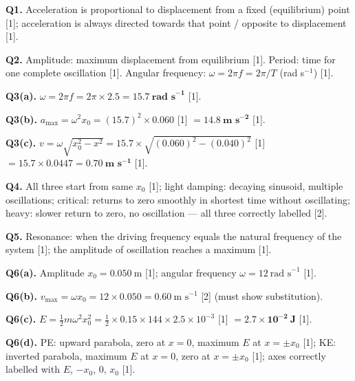 \begin{markscheme}

\textbf{Q1.} Acceleration is proportional to displacement from a fixed (equilibrium) point [1]; acceleration is always directed towards that point / opposite to displacement [1].

\vspace{0.5em}\textbf{Q2.} Amplitude: maximum displacement from equilibrium [1]. Period: time for one complete oscillation [1]. Angular frequency: $\omega = 2\pi f = 2\pi/T$ (rad s$^{-1}$) [1].

\vspace{0.5em}\textbf{Q3(a).} $\omega = 2\pi f = 2\pi \times 2.5 = \mathbf{15.7\ \text{rad s}^{-1}}$ [1].

\vspace{0.5em}\textbf{Q3(b).} $a_{\max} = \omega^2 x_0 = (15.7)^2 \times 0.060$ [1] $= \mathbf{14.8\ \text{m s}^{-2}}$ [1].

\vspace{0.5em}\textbf{Q3(c).} $v = \omega\sqrt{x_0^2 - x^2} = 15.7\times\sqrt{(0.060)^2-(0.040)^2}$ [1] $= 15.7\times 0.0447 = \mathbf{0.70\ \text{m s}^{-1}}$ [1].

\vspace{0.5em}\textbf{Q4.} All three start from same $x_0$ [1]; light damping: decaying sinusoid, multiple oscillations; critical: returns to zero smoothly in shortest time without oscillating; heavy: slower return to zero, no oscillation — all three correctly labelled [2].

\vspace{0.5em}\textbf{Q5.} Resonance: when the driving frequency equals the natural frequency of the system [1]; the amplitude of oscillation reaches a maximum [1].

\vspace{0.5em}\textbf{Q6(a).} Amplitude $x_0 = 0.050\ \text{m}$ [1]; angular frequency $\omega = 12\ \text{rad s}^{-1}$ [1].

\vspace{0.5em}\textbf{Q6(b).} $v_{\max} = \omega x_0 = 12 \times 0.050 = 0.60\ \text{m s}^{-1}$ [2] (must show substitution).

\vspace{0.5em}\textbf{Q6(c).} $E = \tfrac{1}{2}m\omega^2 x_0^2 = \tfrac{1}{2}\times 0.15\times 144\times 2.5\times10^{-3}$ [1] $= \mathbf{2.7\times10^{-2}\ \text{J}}$ [1].

\vspace{0.5em}\textbf{Q6(d).} PE: upward parabola, zero at $x=0$, maximum $E$ at $x = \pm x_0$ [1]; KE: inverted parabola, maximum $E$ at $x=0$, zero at $x = \pm x_0$ [1]; axes correctly labelled with $E$, $-x_0$, $0$, $x_0$ [1].


\end{markscheme}
